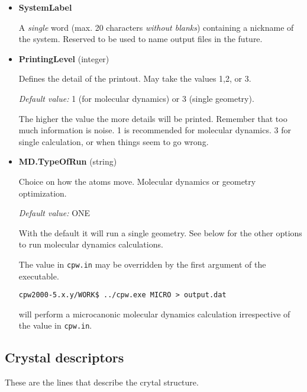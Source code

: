 \documentclass[11pt]{article}
\begin{document}
\begin{itemize}

\item{\bf SystemLabel}

  A \emph{single} word (max. 20 characters \emph{without blanks})
  containing a nickname of the system. Reserved to be used to name output files in the future.


\item{\bf PrintingLevel} (integer)

   Defines the detail of the printout.  May take the values 1,2, or 3.

  \textit{Default value:}  1 (for molecular dynamics) or 3 (single geometry).

   The higher the value the more details will be printed.
   Remember that too much information is noise.  1 is recommended for molecular
   dynamics.  3 for single calculation, or when things seem to go wrong.

\item{\bf MD.TypeOfRun} (string)

   Choice on how the atoms move.  Molecular dynamics or geometry optimization.

  \textit{Default value:}  ONE

  With the default it will run a single geometry.
  See below for the other options to run molecular dynamics calculations.

  The value in \texttt{cpw.in} may be overridden by the first argument
  of the executable.

  \noindent\texttt{cpw2000-5.x.y/WORK\$ ../cpw.exe MICRO > output.dat}

  will perform a microcanonic molecular dynamics calculation irrespective
  of the value in \texttt{cpw.in}.

\end{itemize}


\subsection{Crystal descriptors}

These are the lines that describe the crytal structure.
\end{document}
